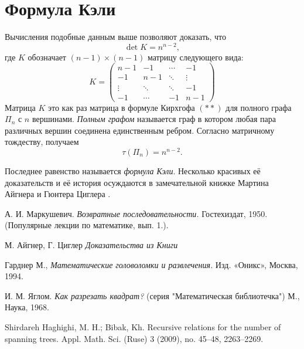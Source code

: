 \documentclass{article}
\begin{document}
\section{Формула Кэли}

Вычисления подобные данным выше позволяют доказать, что
\[\det K=n^{n-2},\]
где $K$ обозначает $(n-1)\times (n-1)$ матрицу следующего вида:
\[
K=\left(
\begin{matrix}
n{-}1&-1&\cdots&-1
\\
-1&n{-}1&\ddots&\vdots
\\
\vdots&\ddots&\ddots&-1
\\
-1&\cdots&-1&n{-}1
\end{matrix}
\right)
\]
Матрица $K$ это как раз матрица в формуле Кирхгофа $({*}{*})$ для полного графа $\Pi_n$ с $n$ вершинами.
\emph{Полным графом} называется граф в котором любая пара различных вершин соединена единственным ребром.
Согласно матричному тождеству, получаем 
\[\tau(\Pi_n)=n^{n-2}.\]

Последнее равенство называется \emph{формула Кэли}.
Несколько красивых её доказательств и её история осуждаются в замечательной книжке Мартина Айгнера и Гюнтера Циглера \cite[Глава 30]{aigner-ziegler}.

\begin{thebibliography}{52}
А. И. Маркушевич. 
\emph{Возвратные последовательности.} 
Гостехиздат, 1950. (Популярные лекции по математике, вып. 1.).

 М. Айгнер, Г. Циглер \emph{Доказательства из Книги}

 Гарднер М., \emph{Математические головоломки и развлечения.}  Изд. «Оникс», Москва, 1994.

И. М. Яглом.
\emph{Как разрезать квадрат?}
(серия "Математическая библиотечка")
М., Наука, 1968.

 Shirdareh Haghighi, M. H.; Bibak, Kh.
Recursive relations for the number of spanning trees. 
Appl. Math. Sci. (Ruse) 3 (2009), no. 45--48, 2263--2269. 
\end{thebibliography}
\end{document}
